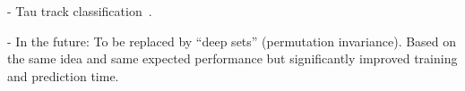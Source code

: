 - Tau track classification~\cite{Maerker:2021hro}.

- In the future: To be replaced by ``deep sets'' (permutation
invariance). Based on the same idea and same expected performance but
significantly improved training and prediction time.

\cite{NIPS2017_f22e4747}


